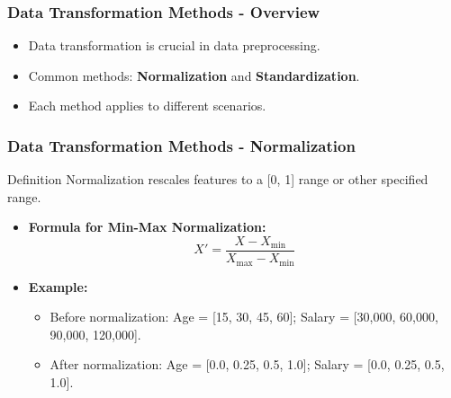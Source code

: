 \documentclass{beamer}
\begin{document}
\begin{frame}[fragile]
    \frametitle{Data Transformation Methods - Overview}
    \begin{itemize}
        \item Data transformation is crucial in data preprocessing.
        \item Common methods: \textbf{Normalization} and \textbf{Standardization}.
        \item Each method applies to different scenarios.
    \end{itemize}
\end{frame}

\begin{frame}[fragile]
    \frametitle{Data Transformation Methods - Normalization}
    \begin{block}{Definition}
        Normalization rescales features to a [0, 1] range or other specified range.
    \end{block}
    
    \begin{itemize}
        \item \textbf{Formula for Min-Max Normalization:}
        \begin{equation}
            X' = \frac{X - X_{\text{min}}}{X_{\text{max}} - X_{\text{min}}}
        \end{equation}
        
        \item \textbf{Example:} 
        \begin{itemize}
            \item Before normalization: Age = [15, 30, 45, 60]; Salary = [30,000, 60,000, 90,000, 120,000].
            \item After normalization: Age = [0.0, 0.25, 0.5, 1.0]; Salary = [0.0, 0.25, 0.5, 1.0].
        \end{itemize}
    \end{itemize}
\end{frame}
\end{document}
